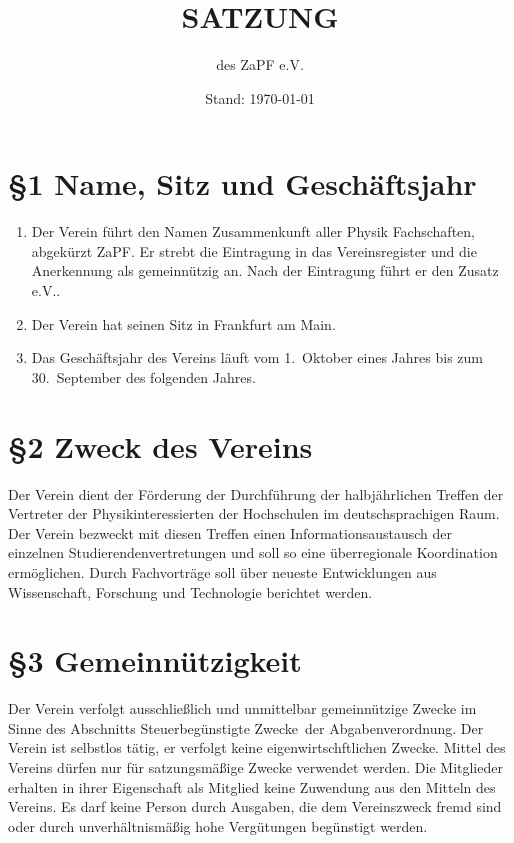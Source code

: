 \documentclass[ngerman]{article}
\begin{document}
\title{SATZUNG}
\date{Stand: \today}

\author{des \textquotedbl{}ZaPF
e.V.\textquotedbl{}}

\maketitle



\section*{§1 Name, Sitz und Geschäftsjahr}
\begin{enumerate}
\item Der Verein führt den Namen \glqq Zusammenkunft aller Physik Fachschaften\grqq, abgekürzt \glqq ZaPF\grqq. Er strebt die Eintragung in das Vereinsregister und die Anerkennung als gemeinnützig an. Nach der Eintragung führt er den Zusatz \glqq e.V.\grqq.
\item Der Verein hat seinen Sitz in Frankfurt am Main.
\item Das Geschäftsjahr des Vereins läuft vom 1.~Oktober eines Jahres bis zum 30.~September des folgenden Jahres.
\end{enumerate}


\section*{§2 Zweck des Vereins}
Der Verein dient der Förderung der Durchführung der halbjährlichen Treffen der Vertreter der Physikinteressierten der Hochschulen im deutschsprachigen Raum.
Der Verein bezweckt mit diesen Treffen einen Informationsaustausch der einzelnen Studierendenvertretungen und soll so eine überregionale Koordination ermöglichen. Durch Fachvorträge soll über neueste Entwicklungen aus Wissenschaft, Forschung und Technologie berichtet werden.


\section*{§3 Gemeinnützigkeit}
Der Verein verfolgt ausschließlich und unmittelbar gemeinnützige Zwecke im Sinne des Abschnitts \glqq Steuerbegünstigte Zwecke\grqq\ der Abgabenverordnung. Der Verein ist selbstlos tätig, er verfolgt keine eigenwirtschftlichen Zwecke. Mittel des Vereins dürfen nur für satzungsmäßige Zwecke verwendet werden. Die Mitglieder erhalten in
ihrer Eigenschaft als Mitglied keine Zuwendung aus den Mitteln des Vereins. Es darf keine Person durch Ausgaben, die dem Vereinszweck fremd sind oder durch unverhältnismäßig hohe Vergütungen begünstigt werden.
\end{document}
